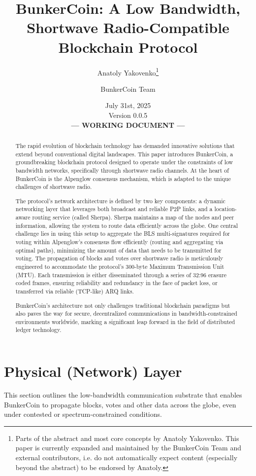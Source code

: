 \documentclass{article}
\title{BunkerCoin: A Low Bandwidth, Shortwave Radio-Compatible Blockchain Protocol}
\author{Anatoly Yakovenko\thanks{Parts of the abstract and most core concepts by Anatoly Yakovenko. This paper is currently expanded and maintained by the BunkerCoin Team and external contributors, i.e. do not automatically expect content (especially beyond the abstract) to be endorsed by Anatoly.} \and BunkerCoin Team}
\date{July 31st, 2025\\Version 0.0.5 \\[1em] \textbf{--- WORKING DOCUMENT ---}}
\begin{document}
\maketitle

\begin{abstract}
The rapid evolution of blockchain technology has demanded innovative solutions that extend beyond conventional digital landscapes. This paper introduces BunkerCoin, a groundbreaking blockchain protocol designed to operate under the constraints of low bandwidth networks, specifically through shortwave radio channels. At the heart of BunkerCoin is the Alpenglow consensus mechanism, which is adapted to the unique challenges of shortwave radio.

The protocol's network architecture is defined by two key components: a dynamic networking layer that leverages both broadcast and reliable P2P links, and a location-aware routing service (called Sherpa). Sherpa maintains a map of the nodes and peer information, allowing the system to route data efficiently across the globe. One central challenge lies in using this setup to aggregate the BLS multi-signatures required for voting within Alpenglow's consensus flow efficiently (routing and aggregating via optimal paths), minimizing the amount of data that needs to be transmitted for voting. The propagation of blocks and votes over shortwave radio is meticulously engineered to accommodate the protocol's 300-byte Maximum Transmission Unit (MTU). Each transmission is either disseminated through a series of 32:96 erasure coded frames, ensuring reliability and redundancy in the face of packet loss, or transferred via reliable  (TCP-like) ARQ links.

BunkerCoin's architecture not only challenges traditional blockchain paradigms but also paves the way for secure, decentralized communications in bandwidth-constrained environments worldwide, marking a significant leap forward in the field of distributed ledger technology.
\end{abstract}

\section{Physical (Network) Layer}
\label{sec:physical}

This section outlines the low-bandwidth communication substrate that enables BunkerCoin to propagate blocks, votes and other data across the globe, even under contested or spectrum-constrained conditions.
\end{document}
